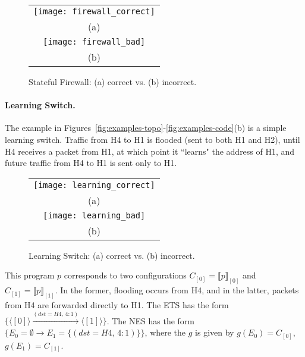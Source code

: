 \documentclass[pldi-cameraready]{sigplanconf}
\begin{document}
\begin{figure}[t]
\centering
\bgroup
\def\arraystretch{0.5}
\begin{tabular}{c}
\texttt{[image: firewall\_correct]} \\
{\scriptsize (a)} \\
\texttt{[image: firewall\_bad]} \\
{\scriptsize (b)}
\end{tabular}
\egroup
\caption{Stateful Firewall: (a) correct vs. (b) incorrect.}
\label{fig:firewall_correct}
\end{figure}



\paragraph{Learning Switch.} The example in Figures~\ref{fig:examples-topo}-\ref{fig:examples-code}(b)
is a simple learning switch. Traffic from H4 to H1 is flooded (sent
to both H1 and H2), until H4 receives a packet from H1, at which
point it ``learns" the address of H1,
and future traffic from H4 to H1 is sent only to H1.

\begin{figure}[b]
\centering
\bgroup
\def\arraystretch{0.5}
\begin{tabular}{c}
\texttt{[image: learning\_correct]} \\
{\scriptsize (a)} \\
\texttt{[image: learning\_bad]} \\
{\scriptsize (b)}
\end{tabular}
\egroup
\caption{Learning Switch: (a) correct vs. (b) incorrect.}
\label{fig:learning_correct}
\end{figure}

This program $p$ corresponds to two configurations
$C_{[0]} = \llbracket{p}\rrbracket_{[0]}$
and
$C_{[1]} = \llbracket{p}\rrbracket_{[1]}$.
In the former, flooding occurs from H4, and in the
latter, packets from H4 are forwarded directly to H1.
The ETS has the form $\{\langle [0] \rangle \xrightarrow{(dst{=}H4,\,{4{:}1})} \langle [1] \rangle\}$.
The NES has the form $\{E_0{=}\emptyset \rightarrow E_1{=}\{(dst{=}H4,\,{4{:}1})\}\}$,
where the $g$ is given by $g(E_0)=C_{[0]}$, $g(E_1)=C_{[1]}$.
\end{document}
